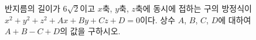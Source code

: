 반지름의 길이가 $6\sqrt{2}$이고 $x$축, $y$축, $z$축에 동시에 접하는 구의 방정식이 $x^2+y^2+z^2+Ax+By+Cz+D=0$이다. 상수 $A$, $B$, $C$, $D$에 대하여 $A+B-C+D$의 값을 구하시오. 
